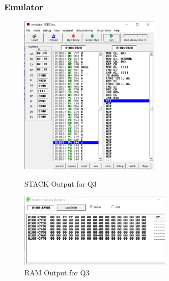 \documentclass{article}
\begin{document}
\subsubsection{Emulator}
\begin{figure}[h]
\begin{center}
\includegraphics[width=0.6\textwidth]{SORT_OUT1} 
\caption{STACK Output for Q3}
\end{center}
\begin{center}
\includegraphics[width=0.65\textwidth]{SORT_OUT2} 
\caption{RAM Output for Q3}
\end{center}
\end{figure}
\end{document}
